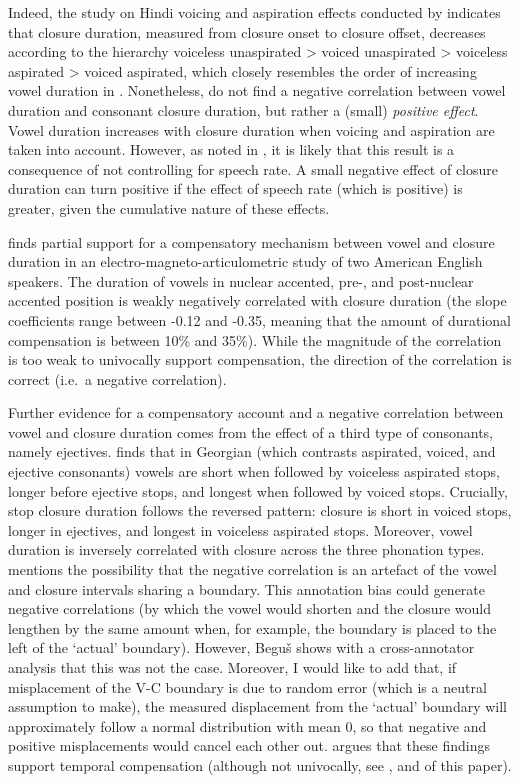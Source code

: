 \documentclass[charis]{glossa}
\begin{document}
Indeed, the study on Hindi voicing and aspiration effects conducted by
\citet{durvasula2012} indicates that closure duration, measured from
closure onset to closure offset, decreases according to the hierarchy
voiceless unaspirated \textgreater{} voiced unaspirated \textgreater{}
voiceless aspirated \textgreater{} voiced aspirated, which closely
resembles the order of increasing vowel duration in
\citet{maddieson1976}. Nonetheless, \citet{durvasula2012} do not find a
negative correlation between vowel duration and consonant closure
duration, but rather a (small) \emph{positive effect}. Vowel duration
increases with closure duration when voicing and aspiration are taken
into account. However, as noted in \citet{begus2017}, it is likely that
this result is a consequence of not controlling for speech rate. A small
negative effect of closure duration can turn positive if the effect of
speech rate (which is positive) is greater, given the cumulative nature
of these effects.

\citet{de-jong1991} finds partial support for a compensatory mechanism
between vowel and closure duration in an electro-magneto-articulometric
study of two American English speakers. The duration of vowels in
nuclear accented, pre-, and post-nuclear accented position is weakly
negatively correlated with closure duration (the slope coefficients
range between -0.12 and -0.35, meaning that the amount of durational
compensation is between 10\% and 35\%). While the magnitude of the
correlation is too weak to univocally support compensation, the
direction of the correlation is correct (i.e.~a negative correlation).

Further evidence for a compensatory account and a negative correlation
between vowel and closure duration comes from the effect of a third type
of consonants, namely ejectives. \citet{begus2017} finds that in
Georgian (which contrasts aspirated, voiced, and ejective consonants)
vowels are short when followed by voiceless aspirated stops, longer
before ejective stops, and longest when followed by voiced stops.
Crucially, stop closure duration follows the reversed pattern: closure
is short in voiced stops, longer in ejectives, and longest in voiceless
aspirated stops. Moreover, vowel duration is inversely correlated with
closure across the three phonation types. \citet{begus2017} mentions the
possibility that the negative correlation is an artefact of the vowel
and closure intervals sharing a boundary. This annotation bias could
generate negative correlations (by which the vowel would shorten and the
closure would lengthen by the same amount when, for example, the
boundary is placed to the left of the `actual' boundary). However, Beguš
shows with a cross-annotator analysis that this was not the case.
Moreover, I would like to add that, if misplacement of the V-C boundary
is due to random error (which is a neutral assumption to make), the
measured displacement from the `actual' boundary will approximately
follow a normal distribution with mean 0, so that negative and positive
misplacements would cancel each other out. \citet{begus2017} argues that
these findings support temporal compensation (although not univocally,
see \citealt[Section V]{begus2017}, and  of this paper).
\end{document}
